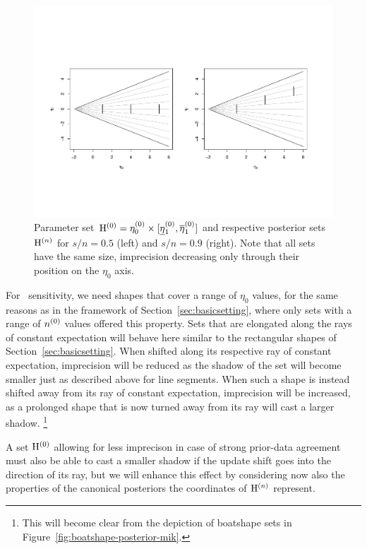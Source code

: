 \begin{figure}  %
\centering
\includegraphics[trim = 15mm 45mm 25mm 60mm, clip, width=\textwidth]{R/boatshape-vertical}%
\caption[Line segment parameter set $\EZ$ %
and respective posterior sets for $s/n=0.5$ and $s/n=0.9$.]%
{Parameter set $\mathrm{H}^{(0)} = \eta_0^{(0)} \times [\text{\underline{$\eta$}${}_1^{(0)}$},\overline{\eta}_1^{(0)}]$ and respective posterior sets $\mathrm{H}^{(n)}$
for $s/n=0.5$ (left) and $s/n=0.9$ (right). Note that all sets have the same size,
imprecision decreasing only through their position on the $\eta_0$ axis.}
\label{fig:boatshape-vertical}
\end{figure}

For \pdc\ sensitivity, we need shapes that cover a range of $\eta_0$ values,
for the same reasons as in the framework of Section~\ref{sec:basicsetting},
where only sets with a range of $n^{(0)}$ values offered this property.
Sets that are elongated along the rays of constant expectation
will behave here similar to the rectangular shapes of Section~\ref{sec:basicsetting}.
When shifted along its respective ray of constant expectation,
imprecision will be reduced as the shadow of the set will become smaller just as described above for line segments.
When such a shape is instead shifted away from its ray of constant expectation,
imprecision will be increased, as a prolonged shape that is now turned away from its ray 
will cast a larger shadow.%
\footnote{This will become clear from the depiction of boatshape sets in Figure~\ref{fig:boatshape-posterior-mik}.} 

A set $\EZ$ allowing for less imprecison in case of strong prior-data agreement
must also be able to cast a smaller shadow if the update shift goes into the direction of its ray,
but we will enhance this effect by considering now also the properties
of the canonical posteriors the coordinates of $\mathrm{H}^{(n)}$ represent.

